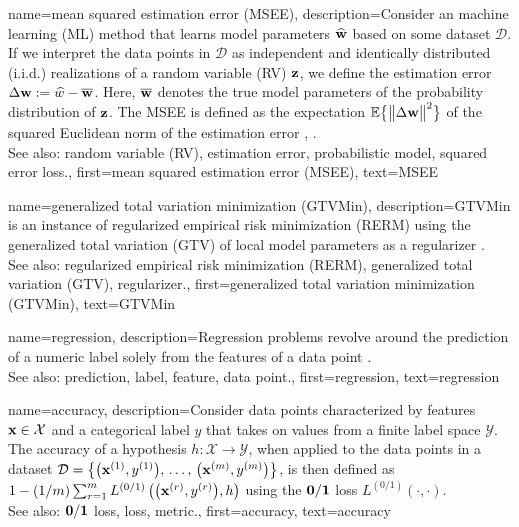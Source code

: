 {
{name={mean squared estimation error (MSEE)},
	description={Consider an machine learning (ML) method that 
		learns model parameters $\widehat{{\bf w}}$ based on some dataset $\mathcal{D}$. 
		If we interpret the data points in $\mathcal{D}$ as independent and identically distributed (i.i.d.) realizations of a random variable (RV) ${\bf z}$, 
		we define the estimation error $\Delta {\bf w} := \widehat{w} - \overline{{\bf w}}$. 
		Here, $\overline{{\bf w}}$ denotes the true model parameters of the probability distribution 
		of ${\bf z}$. The MSEE is 
		defined as the expectation $\mathbb{E}  \big\{ \big\| \Delta {\bf w} \big\|^{2} \big\}$ of the 
		squared Euclidean norm of the estimation error \cite{LC}, \cite{kay}.
					\\ 
		See also: random variable (RV), estimation error, probabilistic model, squared error loss.},
	first={mean squared estimation error (MSEE)},
	text={MSEE} 
}

{name={generalized total variation minimization (GTVMin)},
	description={GTVMin is an instance of regularized empirical risk minimization (RERM) 
		using the generalized total variation (GTV) of local model parameters as a regularizer \cite{ClusteredFLTVMinTSP}.
					\\ 
		See also: regularized empirical risk minimization (RERM), generalized total variation (GTV), regularizer.},
	first={generalized total variation minimization (GTVMin)},
	text={GTVMin} 
}

{name={regression},
	description={Regression problems revolve around the 
		prediction of a numeric label solely from the features of a data point \cite[Ch. 2]{MLBasics}.
					\\ 
		See also: prediction, label, feature, data point.},
	first={regression},
	text={regression} 
}

{name={accuracy},
	description={Consider data points characterized by features ${\bf x} \in \mathcal{X}$ and 
		a categorical label $y$ that takes on values from a finite label space $\mathcal{Y}$. The 
		accuracy of a hypothesis $h: \mathcal{X} \rightarrow \mathcal{Y}$, when applied to the data points in a dataset 
		$\mathcal{D} = \big\{ \big({\bf x}^{(1)}, y^{(1)} \big), \,\ldots, \,\big({\bf x}^{(m)},y^{(m)}\big) \big\}$, 
		is then defined as $1 - (1/m)\sum_{r=1}^{m} L^{(0/1)}\left(\big({\bf x}^{(r)},y^{(r)}\big),h \right)$ 
		using the $\bf 0/1$ loss $L^{(0/1)}\left(\cdot,\cdot \right)$.
					\\ 
		See also: $\bf 0/1$ loss, loss, metric.},
	first={accuracy},
	text={accuracy} 
}


}

